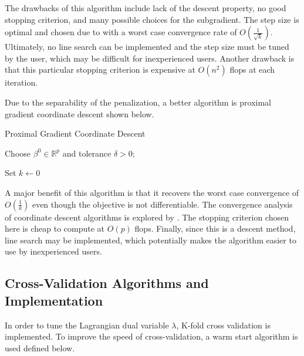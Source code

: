 \documentclass[article]{jss}
\numberwithin{equation}{section}
\newcommand{\R}{\mathbb{R}}
\begin{document}
The drawbacks of this algorithm include lack of the descent property, no good stopping criterion, and many possible choices for the subgradient.
The step size is optimal and chosen due to \cite{nesterov} with a worst case convergence rate of $O(\frac{1}{\sqrt{k}})$.
Ultimately, no line search can be implemented and the step size must be tuned by the user, which may be difficult for inexperienced users.
Another drawback is that this particular stopping criterion is expensive at $O(n^2)$ flops at each iteration.

Due to the separability of the penalization, a better algorithm is proximal gradient coordinate descent shown below.

\vspace{.2cm}
\begin{algorithm}[H]
\caption{Proximal Gradient Coordinate Descent}
Choose $\beta^0 \in \R^p$ and tolerance $\delta > 0$;

Set $k \gets 0$

\end{algorithm}
\vspace{.2cm}

A major benefit of this algorithm is that it recovers the worst case convergence of $O(\frac{1}{k})$ even though the objective is not differentiable. The convergence analysis of coordinate descent algorithms is explored by \cite{nesterov2}. The stopping criterion chosen here is cheap to compute at $O(p)$ flops. Finally, since this is a descent method, line search may be implemented, which potentially makes the algorithm easier to use by inexperienced users.

\subsection{Cross-Validation Algorithms and Implementation}

In order to tune the Lagrangian dual variable $\lambda$, K-fold cross validation is implemented.
To improve the speed of cross-validation, a warm start algorithm is used defined below.
\end{document}
